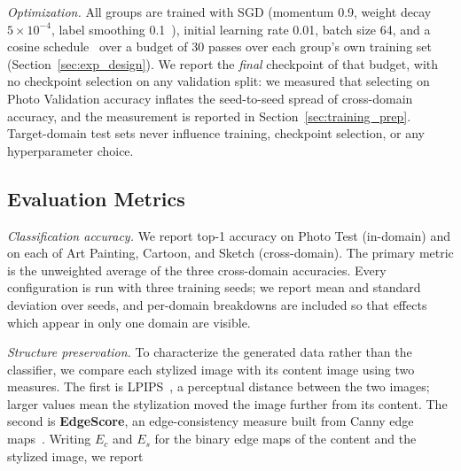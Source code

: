 \textit{Optimization.} All groups are trained with SGD (momentum 0.9, weight decay $5\times10^{-4}$, label smoothing 0.1~\cite{szegedy2016rethinking}), initial learning rate 0.01, batch size 64, and a cosine schedule~\cite{loshchilov2017sgdr} over a budget of 30 passes over each group's own training set (Section~\ref{sec:exp_design}). We report the \textit{final} checkpoint of that budget, with no checkpoint selection on any validation split: we measured that selecting on Photo Validation accuracy inflates the seed-to-seed spread of cross-domain accuracy, and the measurement is reported in Section~\ref{sec:training_prep}. Target-domain test sets never influence training, checkpoint selection, or any hyperparameter choice.



\subsection{Evaluation Metrics}
\label{sec:evaluation_metrics}

\textit{Classification accuracy.} We report top-1 accuracy on Photo Test (in-domain) and on each of Art Painting, Cartoon, and Sketch (cross-domain). The primary metric is the unweighted average of the three cross-domain accuracies. Every configuration is run with three training seeds; we report mean and standard deviation over seeds, and per-domain breakdowns are included so that effects which appear in only one domain are visible.

\textit{Structure preservation.} To characterize the generated data rather than the classifier, we compare each stylized image with its content image using two measures. The first is LPIPS~\cite{zhang2018lpips}, a perceptual distance between the two images; larger values mean the stylization moved the image further from its content. The second is \textbf{EdgeScore}, an edge-consistency measure built from Canny edge maps~\cite{canny1986}. Writing $E_c$ and $E_s$ for the binary edge maps of the content and the stylized image, we report

